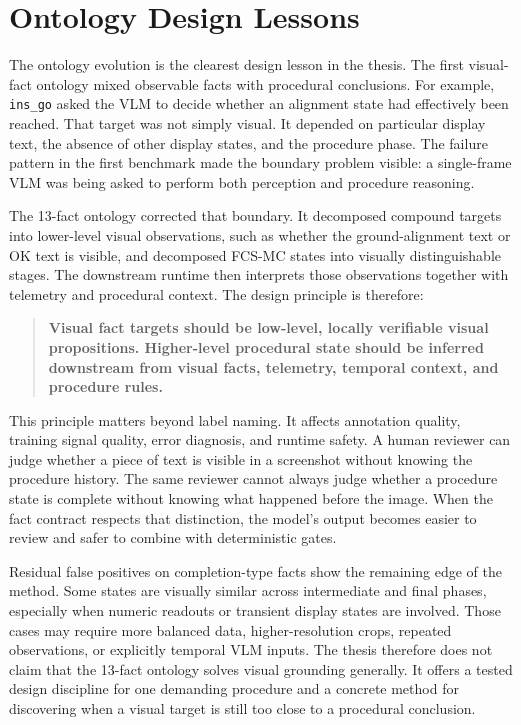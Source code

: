 \section{Ontology Design Lessons}\label{sec:disc-ontology}

The ontology evolution is the clearest design lesson in the thesis. The first
visual-fact ontology mixed observable facts with procedural conclusions. For
example, \texttt{ins\_go} asked the VLM to decide whether an alignment state had
effectively been reached. That target was not simply visual. It depended on
particular display text, the absence of other display states, and the procedure
phase. The failure pattern in the first benchmark made the boundary problem
visible: a single-frame VLM was being asked to perform both perception and
procedure reasoning.

The 13-fact ontology corrected that boundary. It decomposed compound targets
into lower-level visual observations, such as whether the ground-alignment text
or OK text is visible, and decomposed FCS-MC states into visually distinguishable
stages. The downstream runtime then interprets those observations together with
telemetry and procedural context. The design principle is therefore:

\begin{quote}
\textbf{Visual fact targets should be low-level, locally verifiable visual
propositions. Higher-level procedural state should be inferred downstream from
visual facts, telemetry, temporal context, and procedure rules.}
\end{quote}

This principle matters beyond label naming. It affects annotation quality,
training signal quality, error diagnosis, and runtime safety. A human reviewer
can judge whether a piece of text is visible in a screenshot without knowing the
procedure history. The same reviewer cannot always judge whether a procedure
state is complete without knowing what happened before the image. When the fact
contract respects that distinction, the model's output becomes easier to review
and safer to combine with deterministic gates.

Residual false positives on completion-type facts show the remaining edge of the
method. Some states are visually similar across intermediate and final phases,
especially when numeric readouts or transient display states are involved.
Those cases may require more balanced data, higher-resolution crops, repeated
observations, or explicitly temporal VLM inputs. The thesis therefore does not
claim that the 13-fact ontology solves visual grounding generally. It offers a
tested design discipline for one demanding procedure and a concrete method for
discovering when a visual target is still too close to a procedural conclusion.

